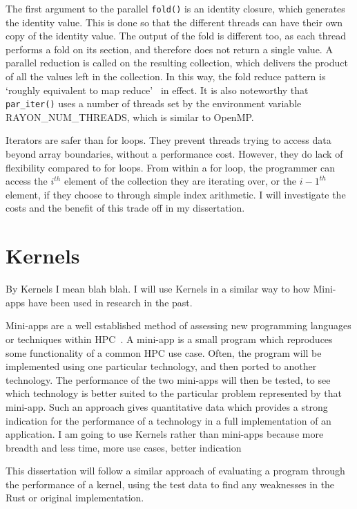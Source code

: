The first argument to the parallel \texttt{fold()} is an identity closure, which generates the identity value. This is done so that the different threads can have their own copy of the identity value. The output of the fold is different too, as each thread performs a fold on its section, and therefore does not return a single value. A parallel reduction is called on the resulting collection, which delivers the product of all the values left in the collection.
In this way, the fold reduce pattern is `roughly equivalent to map reduce'~\cite{rayonFold} in effect. It is also noteworthy that \texttt{par\_iter()} uses a number of threads set by the environment variable RAYON\_NUM\_THREADS, which is similar to OpenMP\@.

Iterators are safer than for loops. They prevent threads trying to access data beyond array boundaries, without a performance cost. However, they do lack of flexibility compared to for loops. From within a for loop, the programmer can access the $i^{th}$ element of the collection they are iterating over, or the $i-1^{th}$ element, if they choose to through simple index arithmetic. I will investigate the costs and the benefit of this trade off in my dissertation.

\section{Kernels}
By Kernels I mean blah blah. I will use Kernels in a similar way to how Mini-apps have been used in research in the past.

Mini-apps are a well established method of assessing new programming languages or techniques within HPC~\cite{Mallinson:2014, Slaughter:2015, martineau2017arch}. A mini-app is a small program which reproduces some functionality of a common HPC use case. Often, the program will be implemented using one particular technology, and then ported to another technology. The performance of the two mini-apps will then be tested, to see which technology is better suited to the particular problem represented by that mini-app. Such an approach gives quantitative data which provides a strong indication for the performance of a technology in a full implementation of an application. I am going to use Kernels rather than mini-apps because more breadth and less time, more use cases, better indication

This dissertation will follow a similar approach of evaluating a program through the performance of a kernel, using the test data to find any weaknesses in the Rust or original implementation.

